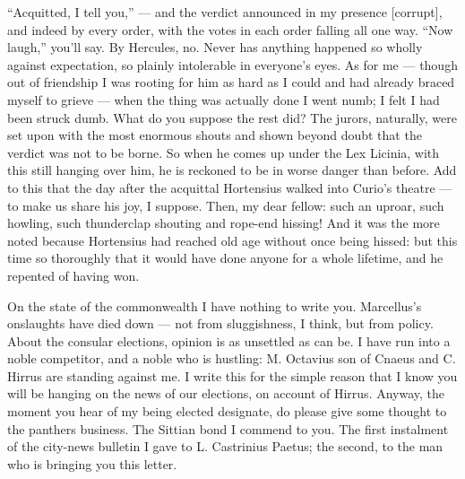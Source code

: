 

 ``Acquitted, I tell you,'' --- and the verdict announced in my presence [corrupt], and indeed by every order, with the votes in each order falling all one way. ``Now laugh,'' you'll say. By Hercules, no. Never has anything happened so wholly against expectation, so plainly intolerable in everyone's eyes. As for me --- though out of friendship I was rooting for him as hard as I could and had already braced myself to grieve --- when the thing was actually done I went numb; I felt I had been struck dumb. What do you suppose the rest did? The jurors, naturally, were set upon with the most enormous shouts and shown beyond doubt that the verdict was not to be borne. So when he comes up under the Lex Licinia, with this still hanging over him, he is reckoned to be in worse danger than before. Add to this that the day after the acquittal Hortensius walked into Curio's theatre --- to make us share his joy, I suppose. Then, my dear fellow: such an uproar, such howling, such thunderclap shouting and rope-end hissing! And it was the more noted because Hortensius had reached old age without once being hissed: but this time so thoroughly that it would have done anyone for a whole lifetime, and he repented of having won.

 On the state of the commonwealth I have nothing to write you. Marcellus's onslaughts have died down --- not from sluggishness, I think, but from policy. About the consular elections, opinion is as unsettled as can be. I have run into a noble competitor, and a noble who is hustling: M. Octavius son of Cnaeus and C. Hirrus are standing against me. I write this for the simple reason that I know you will be hanging on the news of our elections, on account of Hirrus. Anyway, the moment you hear of my being elected designate, do please give some thought to the panthers business. The Sittian bond I commend to you. The first instalment of the city-news bulletin I gave to L. Castrinius Paetus; the second, to the man who is bringing you this letter.
